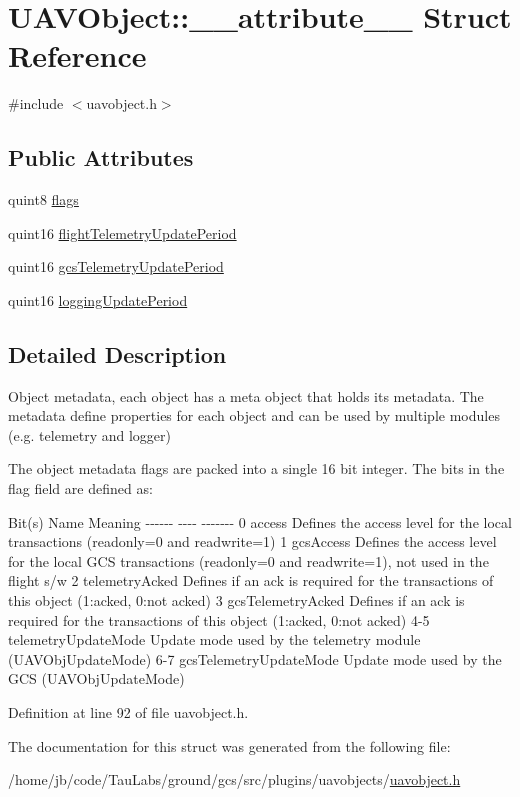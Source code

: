 \hypertarget{struct_u_a_v_object_1_1____attribute____}{\section{\-U\-A\-V\-Object\-:\-:\-\_\-\-\_\-attribute\-\_\-\-\_\- \-Struct \-Reference}
\label{struct_u_a_v_object_1_1____attribute____}
}


{\ttfamily \#include $<$uavobject.\-h$>$}

\subsection*{\-Public \-Attributes}
\begin{DoxyCompactItemize}
\item 
quint8 \hyperlink{group___u_a_v_objects_plugin_gaf5421bbd1e8748b9f0f12ba5b6722bdd}{flags}
\item 
quint16 \hyperlink{group___u_a_v_objects_plugin_gaa29a38fd35ce73e9e4afd2698de44797}{flight\-Telemetry\-Update\-Period}
\item 
quint16 \hyperlink{group___u_a_v_objects_plugin_ga3698244bb0c29537b3d26442624ee03b}{gcs\-Telemetry\-Update\-Period}
\item 
quint16 \hyperlink{group___u_a_v_objects_plugin_gad4c54f8af5beeb9dc2bbe402c9f01299}{logging\-Update\-Period}
\end{DoxyCompactItemize}


\subsection{\-Detailed \-Description}
\-Object metadata, each object has a meta object that holds its metadata. \-The metadata define properties for each object and can be used by multiple modules (e.\-g. telemetry and logger)

\-The object metadata flags are packed into a single 16 bit integer. \-The bits in the flag field are defined as\-:

\-Bit(s) \-Name \-Meaning -\/-\/-\/-\/-\/-\/ -\/-\/-\/-\/ -\/-\/-\/-\/-\/-\/-\/ 0 access \-Defines the access level for the local transactions (readonly=0 and readwrite=1) 1 gcs\-Access \-Defines the access level for the local \-G\-C\-S transactions (readonly=0 and readwrite=1), not used in the flight s/w 2 telemetry\-Acked \-Defines if an ack is required for the transactions of this object (1\-:acked, 0\-:not acked) 3 gcs\-Telemetry\-Acked \-Defines if an ack is required for the transactions of this object (1\-:acked, 0\-:not acked) 4-\/5 telemetry\-Update\-Mode \-Update mode used by the telemetry module (\-U\-A\-V\-Obj\-Update\-Mode) 6-\/7 gcs\-Telemetry\-Update\-Mode \-Update mode used by the \-G\-C\-S (\-U\-A\-V\-Obj\-Update\-Mode) 

\-Definition at line 92 of file uavobject.\-h.



\-The documentation for this struct was generated from the following file\-:\begin{DoxyCompactItemize}
\item 
/home/jb/code/\-Tau\-Labs/ground/gcs/src/plugins/uavobjects/\hyperlink{uavobject_8h}{uavobject.\-h}\end{DoxyCompactItemize}
